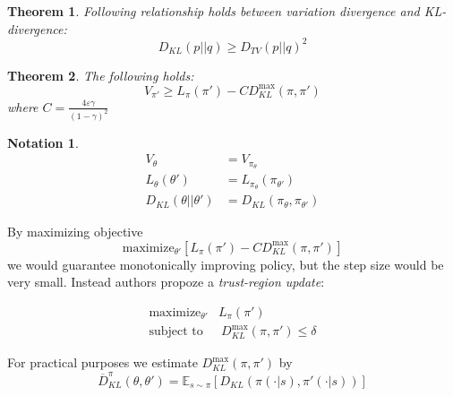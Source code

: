 \documentclass[10pt]{article}
\numberwithin{equation}{subsection}
\newcommand{\E}{\ensuremath{\mathbb{E}}}
\newcommand{\mpi}{\ensuremath{\pi}\xspace}
\newcommand{\mpip}{{\ensuremath{\pi'}}\xspace}
\newcommand{\mpit}{{\ensuremath{\pi_{\theta}}}\xspace}
\newcommand{\mpitp}{{{\ensuremath{\pi_{\theta'}}}}\xspace}
\theoremstyle{plain}
\newtheorem{theorem}{Theorem}[subsection]
\theoremstyle{definition}
\newtheorem{notation}{Notation}[subsection]
\begin{document}
\begin{theorem}
Following relationship holds between variation divergence and KL-divergence:
\begin{equation}
D_{KL}(p || q) \geq D_{TV}(p || q)^2
\end{equation}
\end{theorem}

\begin{theorem}
The following holds:
\begin{equation}
V_\mpip \geq L_\mpi(\mpip) - C D_{KL}^{\max}(\mpi, \mpip)
\end{equation}
where $C = \frac{4 \varepsilon\gamma}{(1 - \gamma)^2}$
\end{theorem}

\begin{notation}
\begin{align*}
V_\theta &= V_{\mpit} \\
L_\theta (\theta') &= L_\mpit(\mpitp) \\
D_{KL}(\theta || \theta') &= D_{KL} (\mpit, \mpitp)
\end{align*}
\end{notation}

By maximizing objective 
\begin{equation}
\textrm{maximize}_{\theta'} \left[ L_\mpi(\mpip) - C D_{KL}^{\max}(\mpi, \mpip) \right]
\end{equation}
we would guarantee monotonically improving policy, but the step size would be very small.
Instead authors propoze a \emph{trust-region update}:

\begin{align}
\textrm{maximize}_{\theta'} &  L_\mpi(\mpip)  \\
\textrm{subject to} &\ D_{KL}^{\max}(\mpi, \mpip) \le \delta
\end{align}

For practical purposes we estimate $D_{KL}^{\max}(\mpi, \mpip)$ 
by 
$$
\overline D^\mpi_{KL}(\theta, \theta') = \E_{s \sim \mpi} \left[ D_{KL}(\mpi(\cdot | s), \mpip(\cdot | s))  \right]
$$
\end{document}
